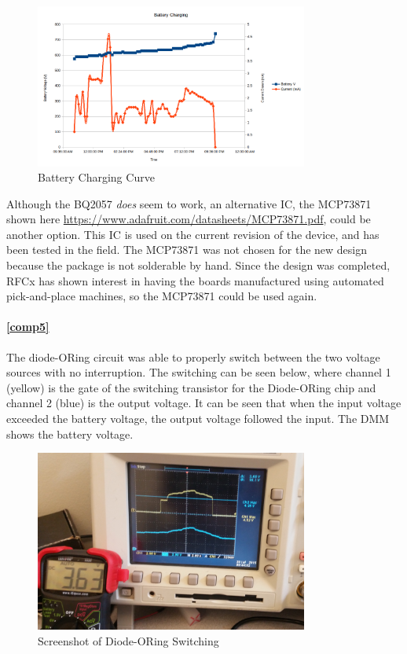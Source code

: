 \documentclass{article}
\numberwithin{figure}{section}
\numberwithin{equation}{section}
\begin{document}
{\begin{figure}[H]
	\centering
	\includegraphics[width=0.8\textwidth]{BatteryCharge}
	\caption{Battery Charging Curve}
	\label{fig:bat_charge}
\end{figure}

\bigskip

Although the BQ2057 \emph{does} seem to work, an alternative IC, the MCP73871 shown here \href{https://www.adafruit.com/datasheets/MCP73871.pdf}{https://www.adafruit.com/datasheets/MCP73871.pdf}, could be another option. This IC is used on the current revision of the device, and has been tested in the field. The MCP73871 was not chosen for the new design because the package is not solderable by hand. Since the design was completed, RFCx has shown interest in having the boards manufactured using automated pick-and-place machines, so the MCP73871 could be used again.

\paragraph{\ref{comp5}}
The diode-ORing circuit was able to properly switch between the two voltage sources with no interruption. The switching can be seen below, where channel 1 (yellow) is the gate of the switching transistor for the Diode-ORing chip and channel 2 (blue) is the output voltage. It can be seen that when the input voltage exceeded the battery voltage, the output voltage followed the input. The DMM shows the battery voltage.

\begin{figure}[H]
	\centering
	\includegraphics[width=0.8\textwidth]{diode_or_screenshot}
	\caption{Screenshot of Diode-ORing Switching}
	\label{fig:diode_or_screenshot}
\end{figure}

}
\end{document}
